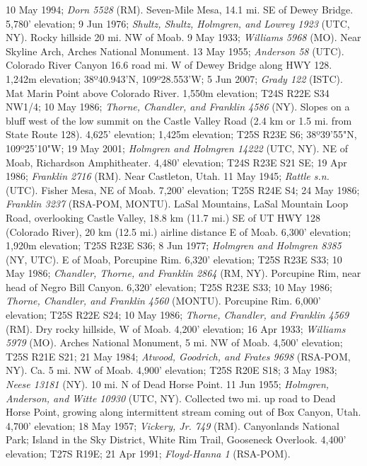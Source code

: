 10 May 1994; \textit{Dorn 5528} (RM).
Seven-Mile Mesa, 14.1 mi. SE of Dewey Bridge. 5,780' elevation; 9 Jun 1976;
\textit{Shultz, Shultz, Holmgren, and Lowrey 1923} (UTC, NY).
Rocky hillside 20 mi. NW of Moab. 9 May 1933; \textit{Williams 5968} (MO).
Near Skyline Arch, Arches National Monument. 13 May 1955;
\textit{Anderson 58} (UTC).
Colorado River Canyon 16.6 road mi. W of Dewey Bridge along HWY 128.
1,242m elevation; 38º40.943'N, 109º28.553'W; 5 Jun 2007;
\textit{Grady 122} (ISTC).
Mat Marin Point above Colorado River. 1,550m elevation; T24S R22E S34 NW1/4;
10 May 1986; \textit{Thorne, Chandler, and Franklin 4586} (NY).
Slopes on a bluff west of the low summit on the Castle Valley Road (2.4 km or
1.5 mi. from State Route 128). 4,625' elevation; 1,425m elevation; T25S R23E S6;
38º39'55"N, 109º25'10"W; 19 May 2001;
\textit{Holmgren and Holmgren 14222} (UTC, NY).
NE of Moab, Richardson Amphitheater. 4,480' elevation; T24S R23E S21 SE;
19 Apr 1986; \textit{Franklin 2716} (RM).
Near Castleton, Utah. 11 May 1945; \textit{Rattle s.n.} (UTC).
Fisher Mesa, NE of Moab. 7,200' elevation; T25S R24E S4; 24 May 1986;
\textit{Franklin 3237} (RSA-POM, MONTU).
LaSal Mountains, LaSal Mountain Loop Road, overlooking Castle Valley, 18.8 km
(11.7 mi.) SE of UT HWY 128 (Colorado River), 20 km (12.5 mi.) airline
distance E of Moab. 6,300' elevation; 1,920m elevation; T25S R23E S36;
8 Jun 1977; \textit{Holmgren and Holmgren 8385} (NY, UTC).
E of Moab, Porcupine Rim. 6,320' elevation; T25S R23E S33; 10 May 1986;
\textit{Chandler, Thorne, and Franklin 2864} (RM, NY).
Porcupine Rim, near head of Negro Bill Canyon. 6,320' elevation; T25S R23E S33;
10 May 1986; \textit{Thorne, Chandler, and Franklin 4560} (MONTU).
Porcupine Rim. 6,000' elevation; T25S R22E S24; 10 May 1986;
\textit{Thorne, Chandler, and Franklin 4569} (RM).
Dry rocky hillside, W of Moab. 4,200' elevation; 16 Apr 1933;
\textit{Williams 5979} (MO).
Arches National Monument, 5 mi. NW of Moab. 4,500' elevation; T25S R21E S21;
21 May 1984; \textit{Atwood, Goodrich, and Frates 9698} (RSA-POM, NY).
Ca. 5 mi. NW of Moab. 4,900' elevation; T25S R20E S18; 3 May 1983;
\textit{Neese 13181} (NY).
10 mi. N of Dead Horse Point. 11 Jun 1955;
\textit{Holmgren, Anderson, and Witte 10930} (UTC, NY).
Collected two mi. up road to Dead Horse Point, growing along intermittent stream
coming out of Box Canyon, Utah. 4,700' elevation; 18 May 1957;
\textit{Vickery, Jr. 749} (RM).
Canyonlands National Park; Island in the Sky District, White Rim Trail,
Gooseneck Overlook. 4,400' elevation; T27S R19E; 21 Apr 1991;
\textit{Floyd-Hanna 1} (RSA-POM).
